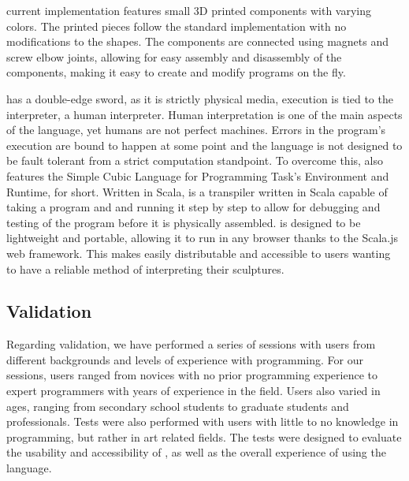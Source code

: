 \sculpt current implementation features small 3D printed components with varying colors.
The printed pieces follow the standard \sculpt implementation with no modifications to the shapes.
The components are connected using magnets and screw elbow joints, allowing for easy assembly and disassembly of the components, making it easy to create and modify programs on the fly.

\sculpt has a double-edge sword, as it is strictly physical media, execution is tied to the interpreter, a human interpreter.
Human interpretation is one of the main aspects of the language, yet humans are not perfect machines. Errors in the program's execution are bound to happen at some point and the language is not designed to be fault tolerant from a strict computation standpoint.
To overcome this, \sculpt also features the Simple Cubic Language for Programming Task's Environment and Runtime, \sculpter for short.
Written in Scala, \sculpter is a transpiler written in Scala capable of taking a \sculpt program and and running it step by step to allow for debugging and testing of the program before it is physically assembled.
\sculpter is designed to be lightweight and portable, allowing it to run in any browser thanks to the Scala.js web framework. This makes easily distributable and accessible to users wanting to have a reliable method of interpreting their sculptures.

\subsection{Validation}
\label{sec:methodology:validation}

Regarding validation, we have performed a series of sessions with users from different backgrounds and levels of experience with programming.
For our sessions, users ranged from novices with no prior programming experience to expert programmers with years of experience in the field.
Users also varied in ages, ranging from secondary school students to graduate students and professionals.
Tests were also performed with users with little to no knowledge in programming, but rather in art related fields.
The tests were designed to evaluate the usability and accessibility of \sculpt, as well as the overall experience of using the language.

